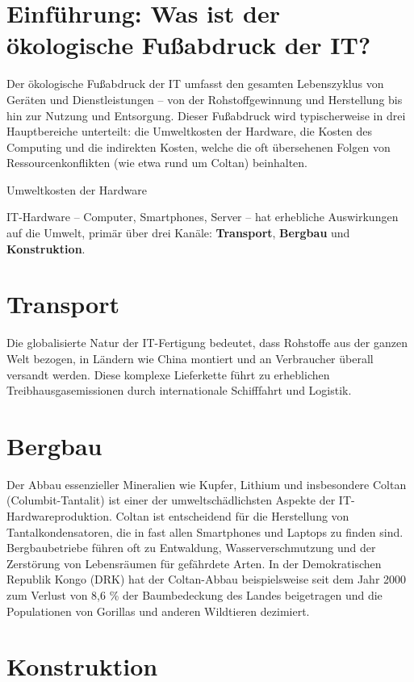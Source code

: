 \documentclass[
  nswissgerman,
  a4paper,
  DIV=11,
  numbers=noendperiod,
  ngerman]{scrreprt}
\begin{document}
\section{Einführung: Was ist der ökologische Fußabdruck der
IT?}\label{einfuxfchrung-was-ist-der-uxf6kologische-fuuxdfabdruck-der-it}

Der ökologische Fußabdruck der IT umfasst den gesamten Lebenszyklus von
Geräten und Dienstleistungen -- von der Rohstoffgewinnung und
Herstellung bis hin zur Nutzung und Entsorgung. Dieser Fußabdruck wird
typischerweise in drei Hauptbereiche unterteilt: die Umweltkosten der
Hardware, die Kosten des Computing und die indirekten Kosten, welche die
oft übersehenen Folgen von Ressourcenkonflikten (wie etwa rund um
Coltan) beinhalten.

Umweltkosten der Hardware

IT-Hardware -- Computer, Smartphones, Server -- hat erhebliche
Auswirkungen auf die Umwelt, primär über drei Kanäle:
\textbf{Transport}, \textbf{Bergbau} und \textbf{Konstruktion}.

\section{Transport}\label{transport}

Die globalisierte Natur der IT-Fertigung bedeutet, dass Rohstoffe aus
der ganzen Welt bezogen, in Ländern wie China montiert und an
Verbraucher überall versandt werden. Diese komplexe Lieferkette führt zu
erheblichen Treibhausgasemissionen durch internationale Schifffahrt und
Logistik.

\section{Bergbau}\label{bergbau}

Der Abbau essenzieller Mineralien wie Kupfer, Lithium und insbesondere
Coltan (Columbit-Tantalit) ist einer der umweltschädlichsten Aspekte der
IT-Hardwareproduktion. Coltan ist entscheidend für die Herstellung von
Tantalkondensatoren, die in fast allen Smartphones und Laptops zu finden
sind. Bergbaubetriebe führen oft zu Entwaldung, Wasserverschmutzung und
der Zerstörung von Lebensräumen für gefährdete Arten. In der
Demokratischen Republik Kongo (DRK) hat der Coltan-Abbau beispielsweise
seit dem Jahr 2000 zum Verlust von 8,6 \% der Baumbedeckung des Landes
beigetragen und die Populationen von Gorillas und anderen Wildtieren
dezimiert.

\section{Konstruktion}\label{konstruktion}
\end{document}
